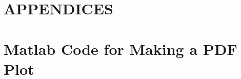 \documentclass[letterpaper,12pt,titlepage,oneside,final]{book}
\theoremstyle{plain}
\let\origdoublepage\cleardoublepage
\newcommand{\clearemptydoublepage}{%
  \clearpage{\pagestyle{empty}\origdoublepage}}
\let\cleardoublepage\clearemptydoublepage
\begin{document}
\appendix

\chapter*{APPENDICES}
\chapter[PDF Plots From Matlab]{Matlab Code for Making a PDF Plot}
\label{AppendixA}





\cleardoublepage %
\renewcommand*{\bibname}{References}




\nocite{*}
\end{document}
